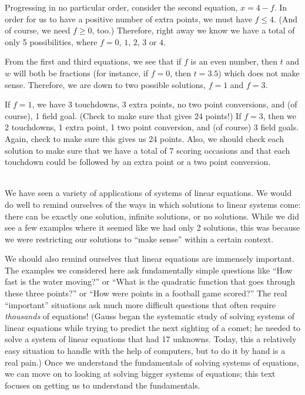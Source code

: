 {Progressing in no particular order, consider the second equation, $x = 4-f$. In order for us to have a positive number of extra points, we must have $f\leq 4$. (And of course, we need $f\geq 0$, too.) Therefore, right away we know we have a total of only 5 possibilities, where $f = 0$, $1$, $2$, $3$ or $4$.

From the first and third equations, we see that if $f$ is an even number, then $t$ and $w$ will both be fractions (for instance, if $f=0$, then $t = 3.5$) which does not make sense. Therefore, we are down to two possible solutions, $f = 1$ and $f=3$. 



If $f=1$, we have 3 touchdowns, 3 extra points, no two point conversions, and (of course), 1 field goal. (Check to make sure that gives 24 points!) If $f=3$, then we 2 touchdowns, 1 extra point, 1 two point conversion, and (of course) 3 field goals. Again, check to make sure this gives us 24 points. Also, we should check each solution to make sure that we have a total of 7 scoring occasions and that each touchdown could be followed by an extra point or a two point conversion.}\\ %

We have seen a variety of applications of systems of linear equations. We would do well to remind ourselves of the ways in which solutions to linear systems come: there can be exactly one solution, infinite solutions, or no solutions. While we did see a few examples where it seemed like we had only 2 solutions, this was because we were restricting our solutions to ``make sense'' within a certain context. 

We should also remind ourselves that linear equations are immensely important. The examples we considered here ask fundamentally simple questions like ``How fast is the water moving?'' or ``What is the quadratic function that goes through these three points?'' or ``How were points in a football game scored?'' The real ``important'' situations ask much more difficult questions that often require \textit{thousands} of equations! (Gauss began the systematic study of solving systems of linear equations while trying to predict the next sighting of a comet; he needed to solve a system of linear equations that had 17 unknowns. Today, this a relatively easy situation to handle with the help of computers, but to do it by hand is a real pain.) Once we understand the fundamentals of solving systems of equations, we can move on to looking at solving bigger systems of equations; this text focuses on getting us to understand the fundamentals.\\



\renewcommand{\arraystretch}{1.0}

